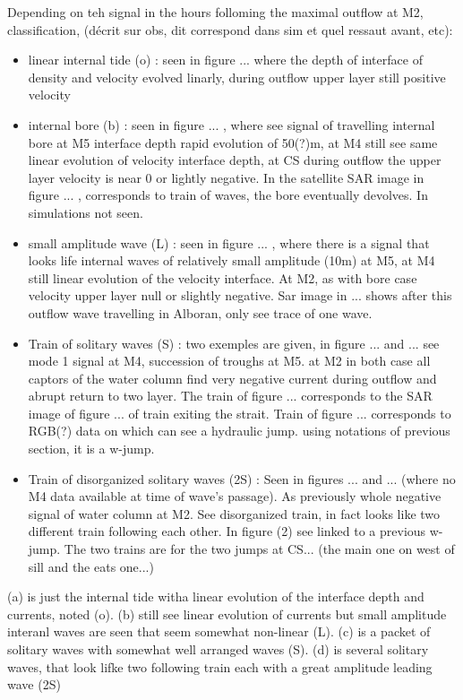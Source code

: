 Depending on teh signal in the hours folloming the maximal outflow at M2, classification, (décrit sur obs, dit correspond dans sim et quel ressaut avant, etc):
\begin{itemize}
\item linear internal tide (o) : seen in figure ... where the depth of interface of density and velocity evolved linarly, during outflow upper layer still positive velocity
\item internal bore (b) : seen in figure ... , where see signal of travelling internal bore at M5 interface depth rapid evolution of 50(?)m, at M4 still see same linear evolution of velocity interface depth, at CS during outflow the upper layer velocity is near 0 or lightly negative. In the satellite SAR image in figure ... , corresponds to train of waves, the bore eventually devolves. In simulations not seen.
\item small amplitude wave (L) : seen in figure ... , where there is a signal that looks life internal waves of relatively small amplitude (10m) at M5, at M4 still linear evolution of the velocity interface. At M2, as with bore case velocity upper layer null or slightly negative. Sar image in ... shows after this outflow wave travelling in Alboran, only see trace of one wave.
\item Train of solitary waves (S) : two exemples are given, in figure ... and ...  see mode 1 signal at M4, succession of troughs at M5. at M2 in both case all captors of the water column find very negative current during outflow and abrupt return to two layer. The train of figure ... corresponds to the SAR image of figure ... of train exiting the strait. Train of figure ... corresponds to RGB(?) data on which can see a hydraulic jump. using notations of previous section, it is a w-jump.
\item Train of disorganized solitary waves (2S) : Seen in figures ... and ... (where no M4 data available at time of wave's passage). As previously whole negative signal of water column at M2. See disorganized train, in fact looks like two different train following each other. In figure (2) see linked to a previous w-jump. The two trains are for the two jumps at CS... (the main one on west of sill and the eats one...)
\end{itemize}
 (a) is just the internal tide witha linear evolution of the interface depth and currents, noted (o). (b) still see linear evolution of currents but small amplitude interanl waves are seen that seem somewhat non-linear (L). (c) is a packet of solitary waves with somewhat well arranged waves (S). (d) is several solitary waves, that look lifke two following train each with a great amplitude leading wave (2S)

